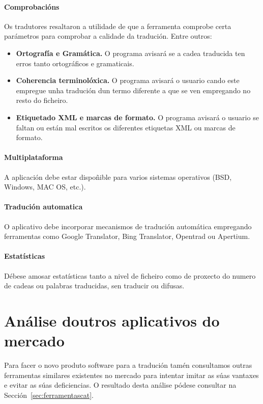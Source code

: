 	\paragraph{Comprobacións} Os tradutores resaltaron a utilidade de que a ferramenta comprobe certa parámetros para comprobar a calidade da tradución. Entre outros:
		\begin{itemize}
			\item \textbf{Ortografía e Gramática.} O programa avisará se a cadea traducida ten erros tanto ortográficos e gramaticais.
			\item \textbf{Coherencia terminolóxica.} O programa avisará o usuario cando este empregue unha tradución dun termo diferente a que se ven empregando no resto do ficheiro.
			\item \textbf{Etiquetado XML e marcas de formato.} O programa avisará o usuario se faltan ou están mal escritos os diferentes etiquetas XML ou marcas de formato.
		\end{itemize}

	\paragraph{Multiplataforma} A aplicación debe estar dispoñible para varios sistemas operativos (BSD, Windows, MAC OS, etc.).

	\paragraph{Tradución automatica} O aplicativo debe incorporar mecanismos de tradución automática empregando ferramentas como Google Translator, Bing Translator, Opentrad ou Apertium.

	\paragraph{Estatísticas} Débese amosar estatísticas tanto a nivel de ficheiro como de proxecto do numero de cadeas ou palabras traducidas, sen traducir ou difusas.

\section{Análise doutros aplicativos do mercado}
Para facer o novo produto software para a tradución tamén consultamos outras ferramentas similares existentes no mercado para intentar imitar as súas vantaxes e evitar as súas deficiencias. O resultado desta análise pódese consultar na Sección~\ref{sec:ferramentascat}.

